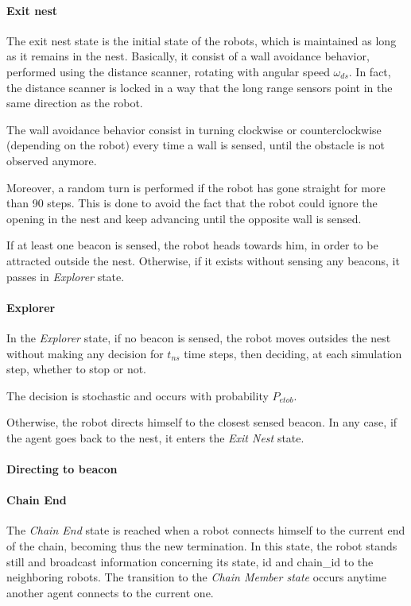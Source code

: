 \paragraph{Exit nest}
The exit nest state is the initial state of the robots, which is maintained as long as it remains in the nest.
Basically, it consist of a wall avoidance behavior, performed using the distance scanner, rotating with angular speed $\omega_{ds}$.
In fact, the distance scanner is locked in a way that the long range sensors point in the same direction as the robot.

The wall avoidance behavior consist in turning clockwise or counterclockwise (depending on the robot) every time a wall is sensed, until the obstacle is not observed anymore.

Moreover, a random turn is performed if the robot has gone straight for more than 90 steps.
This is done to avoid the fact that the robot could ignore the opening in the nest and keep advancing until the opposite wall is sensed.

If at least one beacon is sensed, the robot heads towards him, in order to be attracted outside the nest.
Otherwise, if it exists without sensing any beacons, it passes in \emph{Explorer} state.
\paragraph{Explorer}
In the \emph{Explorer} state, if no beacon is sensed, the robot moves outsides the nest without making any decision for $t_{ns}$ time steps, then deciding, at each simulation step, whether to stop or not.

The decision is stochastic and occurs with probability $P_{etob}$.

Otherwise, the robot directs himself to the closest sensed beacon.
In any case, if the agent goes back to the nest, it enters the \emph{Exit Nest} state.
\paragraph{Directing to beacon}

\paragraph{Chain End}
The \emph{Chain End} state is reached when a robot connects himself to the current end of the chain, becoming thus the new termination.
In this state, the robot stands still and broadcast information concerning its state, id and chain\_id to the neighboring robots.
The transition to the \emph{Chain Member state} occurs anytime another agent connects to the current one.

